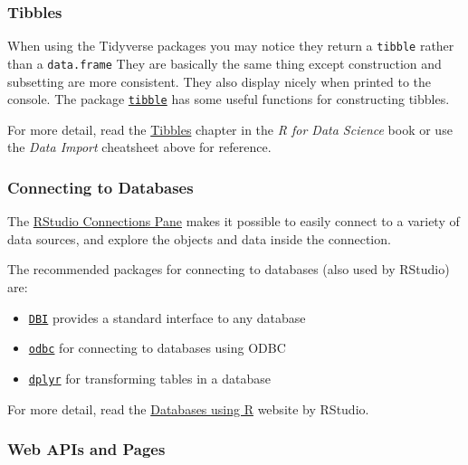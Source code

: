 \documentclass[]{book}
\providecommand{\tightlist}{%
  \setlength{\itemsep}{0pt}\setlength{\parskip}{0pt}}
\begin{document}
\hypertarget{tibbles}{%
\subsubsection{Tibbles}\label{tibbles}}

When using the Tidyverse packages you may notice they return a \texttt{tibble} rather than a
\texttt{data.frame} They are basically the same thing except construction and subsetting are more
consistent. They also display nicely when printed to the console. The package
\href{http://tibble.tidyverse.org/}{\texttt{tibble}} has some useful functions for constructing tibbles.

For more detail, read the \href{https://r4ds.had.co.nz/tibbles.html}{Tibbles} chapter in the
\emph{R for Data Science} book or use the \emph{Data Import} cheatsheet above for reference.

\hypertarget{connecting-to-databases}{%
\subsubsection{Connecting to Databases}\label{connecting-to-databases}}

The \href{https://db.rstudio.com/rstudio/connections/}{RStudio Connections Pane} makes it possible
to easily connect to a variety of data sources, and explore the objects and data inside the
connection.

The recommended packages for connecting to databases (also used by RStudio) are:

\begin{itemize}
\tightlist
\item
  \href{https://db.rstudio.com/DBI}{\texttt{DBI}} provides a standard interface to any database
\item
  \href{https://db.rstudio.com/odbc/}{\texttt{odbc}} for connecting to databases using ODBC
\item
  \href{https://db.rstudio.com/dplyr/}{\texttt{dplyr}} for transforming tables in a database
\end{itemize}

For more detail, read the \href{https://db.rstudio.com/}{Databases using R} website by RStudio.

\hypertarget{web-apis-and-pages}{%
\subsubsection{Web APIs and Pages}\label{web-apis-and-pages}}
\end{document}
